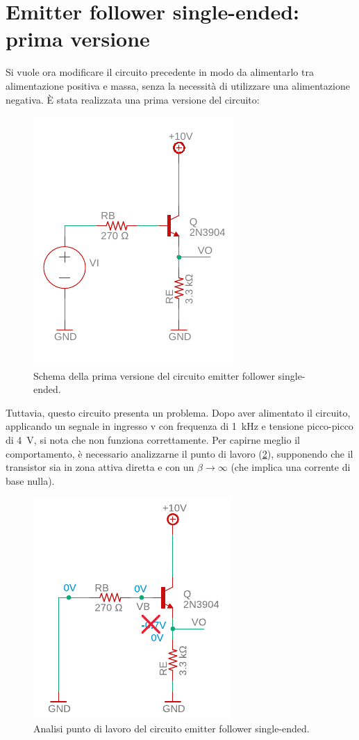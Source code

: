 \section{Emitter follower single-ended: prima versione}
Si vuole ora modificare il circuito precedente in modo da alimentarlo tra alimentazione positiva e massa, senza la necessità di utilizzare una alimentazione negativa. \`E stata realizzata una prima versione del circuito:
\begin{figure}[h!]
	\centering
	\includegraphics[width=0.4\linewidth]{./OtherFiles/Laboratorio 2/emitter follower}
	\caption{Schema della prima versione del circuito emitter follower single-ended.}
	\label{fig:emitterfollwer_se}
\end{figure}

\noindent
Tuttavia, questo circuito presenta un problema. Dopo aver alimentato il circuito, applicando un segnale in ingresso v con frequenza di \SI{1}{\kilo\hertz} e tensione picco-picco di \SI{4}{\volt}, si nota che non funziona correttamente. Per capirne meglio il comportamento,  è necessario analizzarne il punto di lavoro (\Fig\ref{fig:emitterfollwer_se_DC}), supponendo che il transistor sia in zona attiva diretta e con un $\beta\to\infty$ (che implica una corrente di base nulla).
\begin{figure}[h!]
	\centering
	\includegraphics[width=0.4\linewidth]{./OtherFiles/Laboratorio 2/emitter follower_punto di lavoro-printout}
	\caption{Analisi punto di lavoro del circuito emitter follower single-ended.}
	\label{fig:emitterfollwer_se_DC}
\end{figure}

